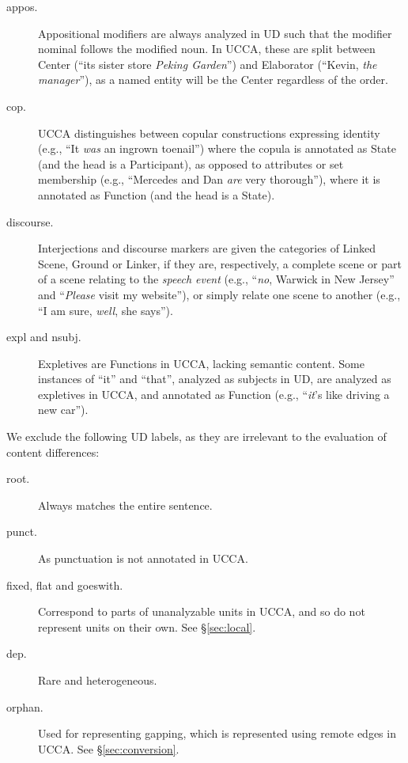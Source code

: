 \documentclass[11pt,a4paper]{article}
\begin{document}
\begin{description}
    \item[appos.]
    Appositional modifiers are always analyzed in UD such that
    the modifier nominal follows the modified noun.
    In UCCA, these are split between Center
    (``its sister store \textit{Peking Garden}'')
    and Elaborator (``Kevin, \textit{the manager}''),
    as a named entity will be the Center regardless of the order.
    \item[cop.]
    UCCA distinguishes between copular constructions expressing
    identity (e.g., ``It \textit{was} an ingrown toenail'') where the copula is annotated as State
    (and the head is a Participant),
    as opposed to attributes or set membership
    (e.g., ``Mercedes and Dan \textit{are} very thorough''), where it is annotated as Function
    (and the head is a State).    
    \item[discourse.]
    Interjections and discourse markers are given the categories of
    Linked Scene, Ground or Linker,
    if they are, respectively, a complete scene or part of a scene relating to the \textit{speech event}
    (e.g., ``\textit{no}, Warwick in New Jersey'' and
    ``\textit{Please} visit my website''),
    or simply relate one scene to another
    (e.g., ``I am sure, \textit{well}, she says'').
    \item[expl and nsubj.]
    Expletives are Functions in UCCA, lacking semantic content.
    Some instances of ``it'' and ``that'', analyzed as subjects in UD,
    are analyzed as expletives in UCCA, and annotated as Function
    (e.g., ``\textit{it}'s like driving a new car'').    
\end{description}

We exclude the following UD labels,
as they are irrelevant to the evaluation of content differences:

\begin{description}
  \item[root.] Always matches the entire sentence.
  \item[punct.] As punctuation is not annotated in UCCA.
  \item[fixed, flat and goeswith.] Correspond to parts of unanalyzable units in UCCA,
    and so do not represent units on their own. See \S\ref{sec:local}.
  \item[dep.] Rare and heterogeneous.
  \item[orphan.] Used for representing gapping, which is represented using remote edges in UCCA. See \S\ref{sec:conversion}.
\end{description}
\end{document}
